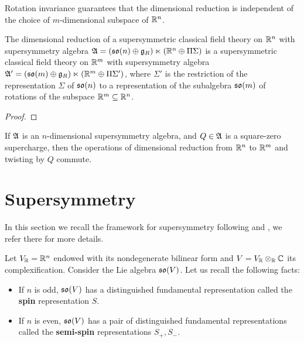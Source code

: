 \documentclass[10pt, oneside]{article}
\begin{document}
Rotation invariance guarantees that the dimensional reduction is independent of the choice of $m$-dimensional subspace of $\mathbb R^n$.

\begin{prop} \label{dim_red_SUSY_prop}
The dimensional reduction of a supersymmetric classical field theory on $\mathbb R^n$ with supersymmetry algebra $\mathfrak{A} = (\mathfrak{so}(n) \oplus \mathfrak{g}_R) \ltimes (\mathbb R^n \oplus \Pi \Sigma)$ is a supersymmetric classical field theory on $\mathbb R^m$ with supersymmetry algebra $\mathfrak{A}' = (\mathfrak{so}(m) \oplus \mathfrak{g}_R) \ltimes (\mathbb R^m \oplus \Pi \Sigma')$, where $\Sigma'$ is the restriction of the representation $\Sigma$ of $\mathfrak{so}(n)$ to a representation of the subalgebra $\mathfrak{so}(m)$ of rotations of the subspace $\mathbb R^m \subseteq \mathbb R^n$.
\end{prop}

\begin{proof}
\end{proof}


\begin{lemma}
If $\mathfrak{A}$ is an $n$-dimensional supersymmetry algebra, and $Q \in \mathfrak{A}$ is a square-zero supercharge, then the operations of dimensional reduction from $\mathbb R^n$ to $\mathbb R^m$ and twisting by $Q$ commute.
\end{lemma}

\section{Supersymmetry} \label{sec: susy}

In this section we recall the framework for supersymmetry following \cite{ElliottSafronov} and \cite{DeligneSpinors}, we refer there for more details.

Let $V_\mathbb R = \mathbb R^n$ endowed with its nondegenerate bilinear form and $V=V_\mathbb R\otimes_\mathbb R\mathbb C$ its complexification. Consider the Lie algebra $\mathfrak{so}(V)$. Let us recall the following facts:
\begin{itemize}
\item If $n$ is odd, $\mathfrak{so}(V)$ has a distinguished fundamental representation called the {\bf spin} representation $S$.

\item If $n$ is even, $\mathfrak{so}(V)$ has a pair of distinguished fundamental representations called the {\bf semi-spin} representations $S_+, S_-$.
\end{itemize}
\end{document}
